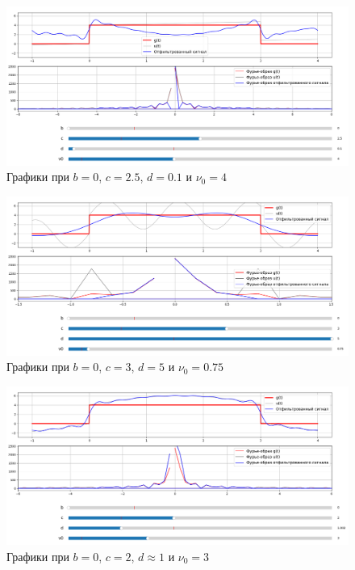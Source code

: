 \documentclass[a4paper,12pt]{article}
\begin{document}
\begin{figure}[H]  
    \centering
    \includegraphics[width=1\textwidth]{../images/1.2.1.png}
    \caption{Графики при \(b = 0\), \(c =  2.5\), \(d = 0.1\) и \(\nu_0 = 4\)}  
    \label{fig:my_image}  
\end{figure}


\begin{figure}[H]  
    \centering
    \includegraphics[width=1\textwidth]{../images/1.2.2.png}
    \caption{Графики при \(b = 0\), \(c =  3\), \(d = 5\) и \(\nu_0 = 0.75\)}  
    \label{fig:my_image}  
\end{figure}


\begin{figure}[H]  
    \centering
    \includegraphics[width=1\textwidth]{../images/1.2.3.png}
    \caption{Графики при \(b = 0\), \(c =  2\), \(d \approx 1\) и \(\nu_0 = 3\)}  
    \label{fig:my_image}  
\end{figure}
\end{document}
